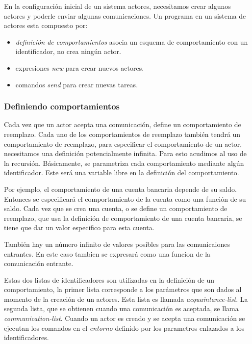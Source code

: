 En la configuración inicial de un sistema actores, necesitamos crear algunos actores y poderle enviar algunas comunicaciones. Un programa en un sistema de actores esta compuesto por:

\begin{itemize}
 \item \textit{definición de comportamientos} asocia un esquema de comportamiento con un identificador, no crea ningún actor.
 \item expresiones \textit{new} para crear nuevos actores.
 \item comandos \textit{send} para crear nuevas tareas.
\end{itemize}


\subsubsection*{Definiendo comportamientos}\label{actores:comportamientos}
Cada vez que un actor acepta una comunicación, define un comportamiento de reemplazo. Cada uno de los comportamientos de reemplazo también tendrá un comportamiento de reemplazo, para especificar el comportamiento de un actor, necesitamos una definición potencialmente infinita. Para esto acudimos al uso de la recursión. Básicamente, se parametriza cada comportamiento mediante algún identificador. Este será una variable libre en la definición del comportamiento. 

Por ejemplo, el comportamiento de una cuenta bancaria depende de su saldo. Entonces se especificará el comportamiento de la cuenta como una función de su saldo. Cada vez que se crea una cuenta, o se define un comportamiento de reemplazo, que usa la definición de comportamiento de una cuenta bancaria, se tiene que dar un valor especifico para esta cuenta.

También hay un número infinito de valores posibles para las comunicaiones entrantes. En este caso tambien se expresará como una funcion de la comunicación entrante.

Estas dos listas de identificadores son utilizadas en la definición de un comportamiento, la primer lista corresponde a los parámetros que son dados al momento de la creación de un actores. Esta lista es llamada \textit{acquaintance-list}. La segunda lista, que se obtienen cuando una comunicación es aceptada, se llama \textit{communication-list}. Cuando un actor es creado y se acepta una comunicación se ejecutan los comandos en el \textit{entorno} definido por los parametros enlazados a los identificadores.

